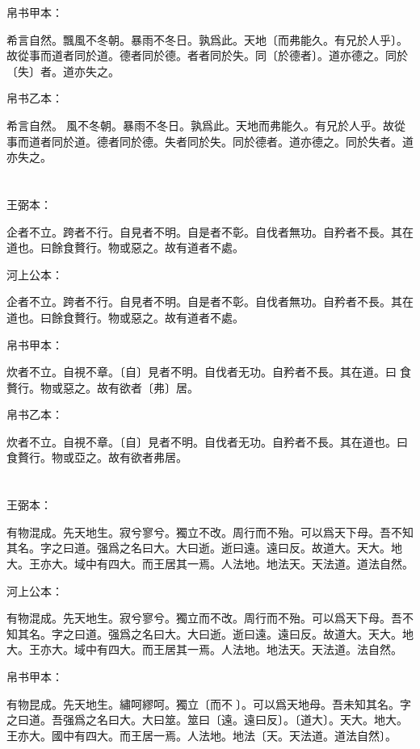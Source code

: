 \documentclass[a5paper]{ctexbook}
\begin{document}
    帛书甲本：

    希言自然。飄風不冬朝。暴雨不冬日。孰爲此。天地〔而弗能久。有兄於人乎〕。故從事而道者同於道。德者同於德。者者同於失。同〔於德者〕。道亦德之。同於〔失〕者。道亦失之。

    帛书乙本：

    希言自然。𠠕風不冬朝。暴雨不冬日。孰爲此。天地而弗能久。有兄於人乎。故從事而道者同於道。德者同於德。失者同於失。同於德者。道亦德之。同於失者。道亦失之。

    \chapter{}
    王弼本：

    企者不立。跨者不行。自見者不明。自是者不彰。自伐者無功。自矜者不長。其在道也。曰餘食贅行。物或惡之。故有道者不處。

    河上公本：

    企者不立。跨者不行。自見者不明。自是者不彰。自伐者無功。自矜者不長。其在道也。曰餘食贅行。物或惡之。故有道者不處。

    帛书甲本：

    炊者不立。自視不章。〔自〕見者不明。自伐者无功。自矜者不長。其在道。曰𥺌食贅行。物或惡之。故有欲者〔弗〕居。

    帛书乙本：

    炊者不立。自視不章。〔自〕見者不明。自伐者无功。自矜者不長。其在道也。曰𥺌食贅行。物或亞之。故有欲者弗居。

    \chapter{}
    王弼本：

    有物混成。先天地生。寂兮寥兮。獨立不改。周行而不殆。可以爲天下母。吾不知其名。字之曰道。强爲之名曰大。大曰逝。逝曰遠。遠曰反。故道大。天大。地大。王亦大。域中有四大。而王居其一焉。人法地。地法天。天法道。道法自然。

    河上公本：

    有物混成。先天地生。寂兮寥兮。獨立而不改。周行而不殆。可以爲天下母。吾不知其名。字之曰道。强爲之名曰大。大曰逝。逝曰遠。遠曰反。故道大。天大。地大。王亦大。域中有四大。而王居其一焉。人法地。地法天。天法道。法自然。

    帛书甲本：

    有物昆成。先天地生。繡呵繆呵。獨立〔而不󱁡〕。可以爲天地母。吾未知其名。字之曰道。吾强爲之名曰大。大曰筮。筮曰〔遠。遠曰反〕。〔道大〕。天大。地大。王亦大。國中有四大。而王居一焉。人法地。地法〔天。天法道。道法自然〕。
\end{document}
